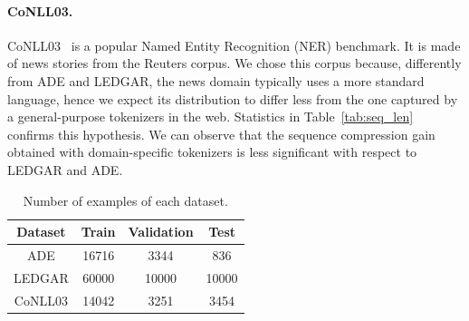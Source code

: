 \documentclass[11pt]{article}
\begin{document}
  \paragraph{CoNLL03.} CoNLL03~\cite{tjong-kim-sang-de-meulder-2003-introduction} is a popular Named Entity Recognition (NER) benchmark. It is made of news stories from the Reuters corpus. We chose this corpus because, differently from ADE and LEDGAR, the news domain typically uses a more standard language, hence we expect its distribution to differ less from the one captured by a general-purpose tokenizers in the web. Statistics in Table~\ref{tab:seq_len} confirms this hypothesis. We can observe that the sequence compression gain obtained with domain-specific tokenizers is less significant with respect to LEDGAR and ADE.
    
\begin{table}[h]
\centering
    \begin{tabular}{cccc}
        \hline
        \textbf{Dataset} & \textbf{Train} & \textbf{Validation} & \textbf{Test}\\ \hline
        
        ADE & 16716 & 3344 & 836\\
        LEDGAR & 60000 & 10000 & 10000\\
        CoNLL03 & 14042 & 3251 & 3454\\
        
        \hline
    \end{tabular}
    \caption{Number of examples of each dataset.}
    \label{tab:data_stats}
\end{table}
\end{document}
